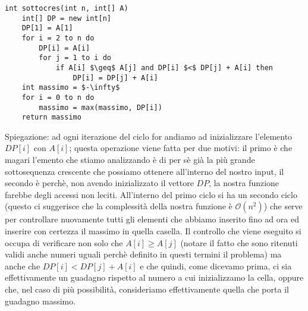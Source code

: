 \documentclass[../cheatSheetAlgoritmi.tex]{subfiles}
\begin{document}
\begin{lstlisting}[caption=Sottoinsieme Crescente di Somma Massima]
int sottocres(int n, int[] A)
	int[] DP = new int[n]
	DP[1] = A[1]
	for i = 2 to n do
		DP[i] = A[i]
		for j = 1 to i do
			if A[i] $\geq$ A[j] and DP[i] $<$ DP[j] + A[i] then
				DP[i] = DP[j] + A[i]
	int massimo = $-\infty$
	for i = 0 to n do
		massimo = max(massimo, DP[i])
	return massimo
\end{lstlisting} 
Spiegazione: ad ogni iterazione del ciclo for andiamo ad inizializzare l'elemento $DP[i]$ con $A[i]$; questa operazione viene fatta per due motivi: il primo è che magari l'emento che stiamo analizzando è di per sè già la più grande sottosequenza crescente che possiamo ottenere all'interno del nostro input, il secondo è perchè, non avendo inizializzato il vettore $DP$, la nostra funzione farebbe degli accessi non leciti. All'interno del primo ciclo si ha un secondo ciclo (questo ci suggerisce che la complessità della nostra funzione è $\mathcal{O}(n^{2})$) che serve per controllare nuovamente tutti gli elementi che abbiamo inserito fino ad ora ed inserire con certezza il massimo in quella casella. Il controllo che viene eseguito si occupa di verificare non solo che $A[i] \geq A[j]$ (notare il fatto che sono ritenuti validi anche numeri uguali perchè definito in questi termini il problema) ma anche che $DP[i] < DP[j] + A[i]$ e che quindi, come dicevamo prima, ci sia effettivamente un guadagno rispetto al numero a cui inizializzamo la cella, oppure che, nel caso di più possibilità, consideriamo effettivamente quella che porta il guadagno massimo.


\newpage
\end{document}

